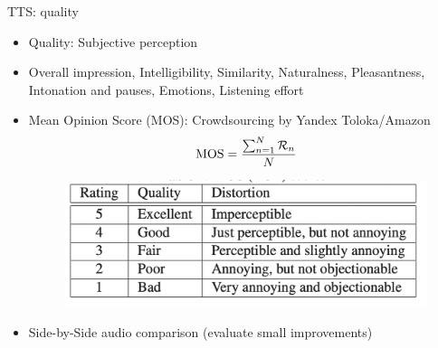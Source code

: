 \begin{frame}{TTS: quality}
    \begin{itemize}
        \item Quality: Subjective perception
        \item Overall impression, Intelligibility, Similarity, Naturalness, Pleasantness, Intonation and pauses, Emotions, Listening effort

        \item Mean Opinion Score (MOS): Crowdsourcing by Yandex Toloka/Amazon
        $$\text{MOS}={\frac{\sum_{n=1}^{N}{\cal R}_{n}}{N}}$$
        \begin{figure}
        	\centering
        	\includegraphics[width=0.75\linewidth]{figs/mos.png}
        \end{figure}
        \item Side-by-Side audio comparison (evaluate small improvements)
    \end{itemize}
\end{frame}

